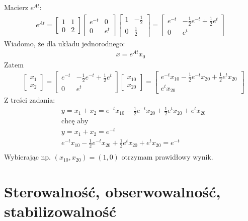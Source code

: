 \documentclass[a4paper,11pt]{article}
\begin{document}
Macierz \( e^{At} \):
\begin{align*}
e^{At} = 
\begin{bmatrix}
1 & 1 \\
0 & 2 
\end{bmatrix}
\begin{bmatrix}
e^{-t} & 0 \\
0 & e^t
\end{bmatrix}
\begin{bmatrix}
1 & -\frac{1}{2} \\
0 & \frac{1}{2}
\end{bmatrix} = 
\begin{bmatrix}
e^{-t} & -\frac{1}{2}e^{-t}+\frac{1}{2}e^t \\
0 & e^t
\end{bmatrix}
\end{align*}
Wiadomo, że dla układu jednorodnego: 
\begin{align*}
x = e^{At}x_0
\end{align*}
Zatem
\begin{align*}
&\begin{bmatrix}
x_1 \\
x_2
\end{bmatrix}
=
\begin{bmatrix}
e^{-t} & -\frac{1}{2}e^{-t}+\frac{1}{2}e^t \\
0 & e^t
\end{bmatrix}
\begin{bmatrix}
x_{10} \\
x_{20}
\end{bmatrix}
=
\begin{bmatrix}
e^{-t}x_{10}-\frac{1}{2}e^{-t}x_{20}+\frac{1}{2}e^tx_{20} \\
e^tx_{20}
\end{bmatrix}
\end{align*}
Z treści zadania:
\begin{align*}
&y = x_1 + x_2 = e^{-t}x_{10}-\frac{1}{2}e^{-t}x_{20}+\frac{1}{2}e^tx_{20} + e^tx_{20} \\
&\text{chcę aby} \\
&y = x_1 + x_2 = e^{-t} \\
&e^{-t}x_{10}-\frac{1}{2}e^{-t}x_{20}+\frac{1}{2}e^tx_{20} + e^tx_{20} = e^{-t} \\
\end{align*}
Wybierając np. \( (x_{10}, x_{20} ) = ( 1,0) \) otrzymam prawidłowy wynik. 




\newpage
\section{Sterowalność, obserwowalność, stabilizowalność}
\end{document}
